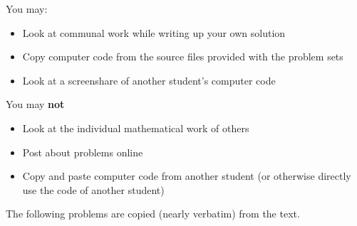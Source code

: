 \documentclass[12pt,letterpaper,noanswers]{exam}
\begin{document}
\noindent You may:
\begin{itemize}
\itemsep-0.2em
    \item Look at communal work while writing up your own solution
    \item Copy computer code from the source files provided with the problem sets
    \item Look at a screenshare of another student's computer code
\end{itemize}

\noindent You may \textbf{not}
\begin{itemize}
\itemsep-0.2em
    \item Look at the individual mathematical work of others
    \item Post about problems online
    \item Copy and paste computer code from another student (or otherwise directly use the code of another student)
\end{itemize}

\eject



\noindent The following problems are copied (nearly verbatim) from the text.
\end{document}
